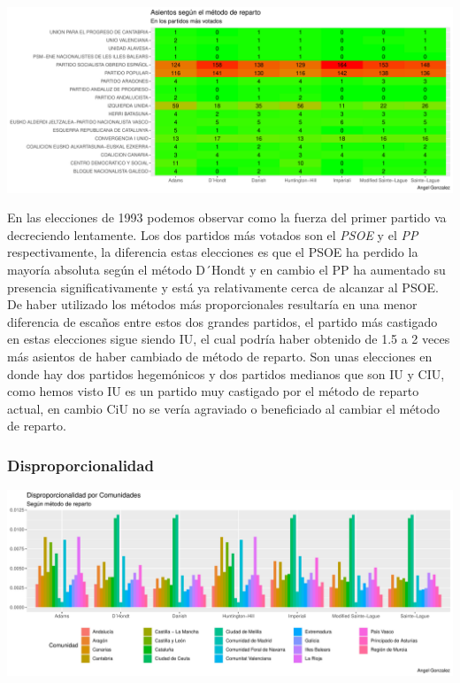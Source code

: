 \documentclass[12pt,a4paper,]{book}
\numberwithin{dummy}{section}
\theoremstyle{ocrenumbox}
\theoremstyle{blacknumex}
\theoremstyle{blacknumbox}
\theoremstyle{ocrenum}
\theoremstyle{ocrenum}
\begin{document}
\begin{center}\includegraphics[width=0.95\linewidth]{figurasR/unnamed-chunk-56-2} \end{center}

En las elecciones de 1993 podemos observar como la fuerza del primer
partido va decreciendo lentamente. Los dos partidos más votados son el
\emph{PSOE} y el \emph{PP} respectivamente, la diferencia estas
elecciones es que el PSOE ha perdido la mayoría absoluta según el método
D´Hondt y en cambio el PP ha aumentado su presencia significativamente y
está ya relativamente cerca de alcanzar al PSOE. De haber utilizado los
métodos más proporcionales resultaría en una menor diferencia de escaños
entre estos dos grandes partidos, el partido más castigado en estas
elecciones sigue siendo IU, el cual podría haber obtenido de 1.5 a 2
veces más asientos de haber cambiado de método de reparto. Son unas
elecciones en donde hay dos partidos hegemónicos y dos partidos medianos
que son IU y CIU, como hemos visto IU es un partido muy castigado por el
método de reparto actual, en cambio CiU no se vería agraviado o
beneficiado al cambiar el método de reparto.

\hypertarget{disproporcionalidad-5}{%
\subsubsection{Disproporcionalidad}\label{disproporcionalidad-5}}

\begin{center}\includegraphics[width=0.95\linewidth]{figurasR/unnamed-chunk-57-1} \end{center}
\end{document}

